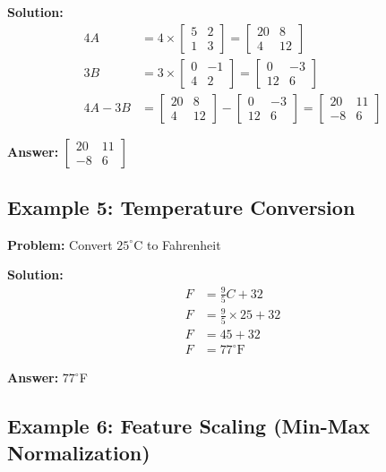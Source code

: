 \documentclass[11pt,a4paper]{article}
\begin{document}
\textbf{Solution:}
\begin{align}
    4A &= 4 \times \begin{bmatrix} 5 & 2 \\ 1 & 3 \end{bmatrix} = \begin{bmatrix} 20 & 8 \\ 4 & 12 \end{bmatrix} \\
    3B &= 3 \times \begin{bmatrix} 0 & -1 \\ 4 & 2 \end{bmatrix} = \begin{bmatrix} 0 & -3 \\ 12 & 6 \end{bmatrix} \\
    4A - 3B &= \begin{bmatrix} 20 & 8 \\ 4 & 12 \end{bmatrix} - \begin{bmatrix} 0 & -3 \\ 12 & 6 \end{bmatrix} = \begin{bmatrix} 20 & 11 \\ -8 & 6 \end{bmatrix}
\end{align}

\textbf{Answer:} $\begin{bmatrix} 20 & 11 \\ -8 & 6 \end{bmatrix}$

\subsection{Example 5: Temperature Conversion}

\textbf{Problem:} Convert $25^\circ$C to Fahrenheit

\textbf{Solution:}
\begin{align}
    F &= \frac{9}{5}C + 32 \\
    F &= \frac{9}{5} \times 25 + 32 \\
    F &= 45 + 32 \\
    F &= 77^\circ\text{F}
\end{align}

\textbf{Answer:} $77^\circ$F

\subsection{Example 6: Feature Scaling (Min-Max Normalization)}
\end{document}

